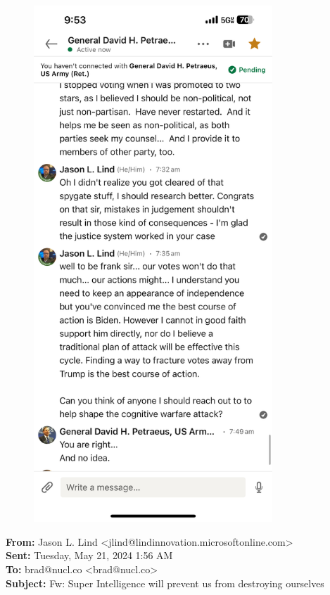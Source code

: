 \documentclass{article}
\begin{document}
\begin{figure}[h] %
    \centering %
    \includegraphics[width=0.8\textwidth]{msg3.jpeg} %
\end{figure}
\textbf{From:} Jason L. Lind \textless jlind@lindinnovation.microsoftonline.com\textgreater \\
\textbf{Sent:} Tuesday, May 21, 2024 1:56 AM\\
\textbf{To:} brad@nucl.co \textless brad@nucl.co\textgreater \\
\textbf{Subject:} Fw: Super Intelligence will prevent us from destroying ourselves
\end{document}
